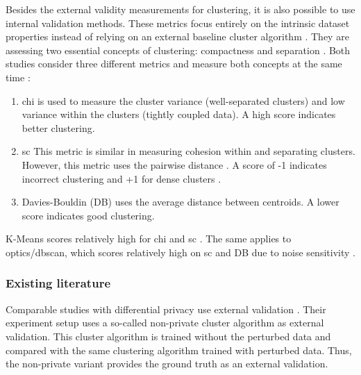 Besides the external validity measurements for clustering, it is also possible to use internal validation methods.
These metrics focus entirely on the intrinsic dataset properties instead of relying on an external baseline cluster algorithm \citep{craenendonck_using_nodate}.
They are assessing two essential concepts of clustering: compactness and separation \citep{hassani_using_2017}.
Both studies consider three different metrics and measure both concepts at the same time \citep{hassani_using_2017}:
\begin{enumerate}
  \item \gls{chi} \citep{calinski_dendrite_1974} is used to measure the cluster variance (well-separated clusters) and low variance within the clusters (tightly coupled data). A high score indicates better clustering.
  \item \gls{sc} \citep{rousseeuw_silhouettes_1987} This metric is similar in measuring cohesion within and separating clusters.
        However, this metric uses the pairwise distance \cite{hassani_using_2017}.
        A score of -1 indicates incorrect clustering and +1 for dense clusters \cite{rousseeuw_silhouettes_1987}.
  \item Davies-Bouldin (DB) \citep{davies_cluster_1979} uses the average distance between centroids. A lower score indicates good clustering.
\end{enumerate}

K-Means scores relatively high for \gls{chi} \citep{craenendonck_using_nodate,hassani_using_2017} and \gls{sc} \citep{craenendonck_using_nodate}.
The same applies to \gls{optics}/\gls{dbscan}, which scores relatively high on \gls{sc} and DB due to noise sensitivity \citep{craenendonck_using_nodate}.

\subsubsection{Existing literature}
Comparable studies with differential privacy use external validation \citep{xia_distributed_2020, sun_privbv_2022}.
Their experiment setup uses a so-called non-private cluster algorithm as external validation.
This cluster algorithm is trained without the perturbed data and compared with the same clustering algorithm trained with perturbed data.
Thus, the non-private variant provides the ground truth as an external validation.

